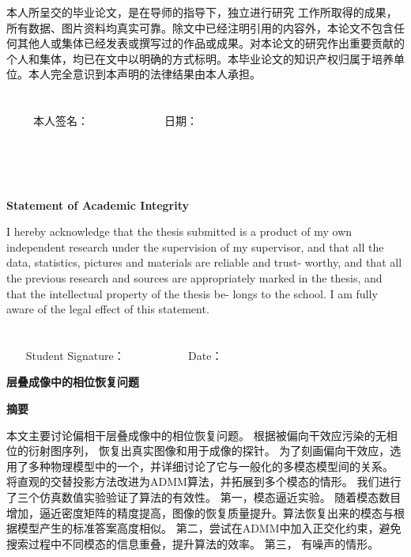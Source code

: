 \documentclass[12pt]{article}
\begin{document}
	\begin{large}
	本人所呈交的毕业论文，是在导师的指导下，独立进行研究 工作所取得的成果，所有数据、图片资料均真实可靠。除文中已经注明引用的内容外，本论文不包含任何其他人或集体已经发表或撰写过的作品或成果。对本论文的研究作出重要贡献的个人和集体，均已在文中以明确的方式标明。本毕业论文的知识产权归属于培养单位。本人完全意识到本声明的法律结果由本人承担。\\ \\ \\
	$~~~~~~~~~~~$本人签名：$~~~~~~~~~~~~~~~~~~~~~~~~~~~~~~~$日期：
	\end{large}
	~\\ \\ \\
	\begin{center}
		\Large \textbf{Statement of Academic Integrity}
	\end{center}

	\begin{large}
	I hereby acknowledge that the thesis submitted is a product of my own independent research under the supervision of my supervisor, and that all the data, statistics, pictures and materials are reliable and trust- worthy, and that all the previous research and sources are appropriately marked in the thesis, and that the intellectual property of the thesis be- longs to the school. I am fully aware of the legal effect of this statement. \\ \\ \\
	$~~~~~~~~$Student Signature：$~~~~~~~~~~~~~~~~~~~~~~~~~~$Date：
	\end{large}
	\newpage
	\thispagestyle{empty}
	\begin{center}
		\LARGE \textbf{层叠成像中的相位恢复问题}
		
	
	\end{center}
	\begin{center}
		\textbf{摘要}
	\end{center}
	
		本文主要讨论偏相干层叠成像中的相位恢复问题。 根据被偏向干效应污染的无相位的衍射图序列， 恢复出真实图像和用于成像的探针。 为了刻画偏向干效应，选用了多种物理模型中的一个，并详细讨论了它与一般化的多模态模型间的关系。 将直观的交替投影方法改进为ADMM算法，并拓展到多个模态的情形。 我们进行了三个仿真数值实验验证了算法的有效性。
		第一，模态逼近实验。 随着模态数目增加，逼近密度矩阵的精度提高，图像的恢复质量提升。算法恢复出来的模态与根据模型产生的标准答案高度相似。  第二，尝试在ADMM中加入正交化约束，避免搜索过程中不同模态的信息重叠，提升算法的效率。 第三， 有噪声的情形。 
	
\end{document}
